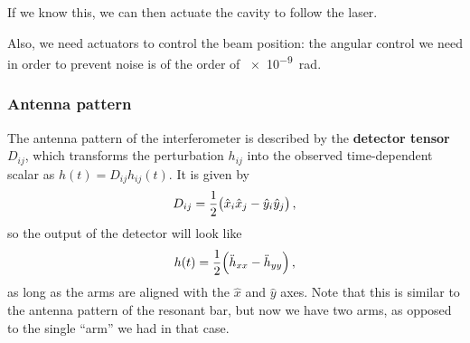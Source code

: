 \documentclass[main.tex]{subfiles}
\begin{document}
If we know this, we can then actuate the cavity to follow the laser. 

Also, we need actuators to control the beam position: the angular control we need in order to prevent noise is of the order of \SI{e-9}{rad}.

\subsubsection{Antenna pattern}

The antenna pattern of the interferometer is described by the \textbf{detector tensor} \(D_{ij}\), which transforms the perturbation \(h_{ij}\) into the observed time-dependent scalar as \(h (t) = D_{ij} h_{ij}(t)\). It is given by 
%
\begin{align}
D_{ij} = \frac{1}{2} \qty(\hat{x}_{i} \hat{x}_{j} - \hat{y}_{i} \hat{y}_{j}) 
\,,
\end{align}
%
so the output of the detector will look like
%
\begin{align}
h(t) = \frac{1}{2} \qty(\ddot{h}_{xx} - \ddot{h}_{yy})
\,,
\end{align}
%
as long as the arms are aligned with the \(\hat{x}\) and \(\hat{y}\) axes. 
Note that this is similar to the antenna pattern of the resonant bar, but now we have two arms, as opposed to the single ``arm'' we had in that case. 

\end{document}
